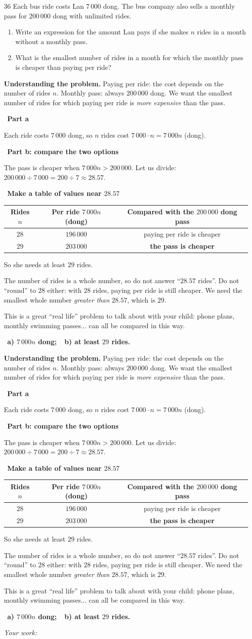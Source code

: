 \documentclass[11pt]{article}
\newif\ifsol \soltrue
\providecommand{\AnsWord}{Đáp số}
\newcommand{\ans}[1]{\par\smallskip{\bfseries\color{tmGreen!88!black}\AnsWord:}\ {\bfseries\color{AnsRed}#1}\par}
\newcommand{\probsol}[1]{%
  \begin{lrbox}{\solmeasure}\begin{minipage}{\dimexpr\linewidth-24pt\relax}#1\end{minipage}\end{lrbox}%
  \ifsol
    \begin{solbox}#1\end{solbox}%
  \else
    \setlength{\solht}{\dimexpr\ht\solmeasure+\dp\solmeasure+0.85cm\relax}%
    \ifdim\solht<1.35cm\setlength{\solht}{1.35cm}\fi
    \ifdim\solht>\StudentMaxWork\setlength{\solht}{\StudentMaxWork}\fi
    \begin{tcolorbox}[colback=white,colframe=Line,boxrule=0.8pt,arc=5pt,
      left=8pt,right=8pt,top=4pt,bottom=4pt,height=\solht]{\footnotesize\color{Slate}\itshape\WorkWord}\end{tcolorbox}%
  \fi}
\newlength{\StudentMaxWork}\setlength{\StudentMaxWork}{7.5cm}
\newcommand{\step}[2]{\par\smallskip\noindent{\bfseries\color{tmBlue!85!black}\StepWord~#1.}\ {\bfseries #2}\par\nopagebreak}
\def\WorkWord{Your work:}
\def\AnsWord{Answer}
\def\StepWord{Step}
\begin{document}
\begin{probbox}{36}{\relax}
Each bus ride costs Lan $7\,000$ dong. The bus company also sells a monthly pass for $200\,000$ dong with unlimited rides.
\begin{enumerate}[label=\alph*),leftmargin=1.6em,itemsep=1pt,topsep=2pt]
\item Write an expression for the amount Lan pays if she makes $n$ rides in a month without a monthly pass.
\item What is the smallest number of rides in a month for which the monthly pass is cheaper than paying per ride?
\end{enumerate}
\end{probbox}
\probsol{
\textbf{Understanding the problem.} Paying per ride: the cost depends on the number of rides $n$. Monthly pass: always $200\,000$ dong. We want the smallest number of rides for which paying per ride is \emph{more expensive} than the pass.
\step{1}{Part a}
Each ride costs $7\,000$ dong, so $n$ rides cost $7\,000\cdot n=7\,000n$ (dong).
\step{2}{Part b: compare the two options}
The pass is cheaper when $7\,000n>200\,000$. Let us divide: $200\,000\div 7\,000=200\div 7\approx 28.57$.
\step{3}{Make a table of values near $28.57$}
\begin{center}
\begin{tabular}{|c|c|c|}
\hline
\rowcolor{tmBlue!10} Rides $n$ & Per ride $7\,000n$ (dong) & Compared with the $200\,000$ dong pass\\ \hline
$28$ & $196\,000$ & paying per ride is cheaper\\ \hline
$29$ & $203\,000$ & \textbf{the pass is cheaper}\\ \hline
\end{tabular}
\end{center}
So she needs at least $29$ rides.
\begin{warnbox}The number of rides is a whole number, so do not answer ``$28.57$ rides''. Do not ``round'' to $28$ either: with $28$ rides, paying per ride is still cheaper. We need the smallest whole number \emph{greater than} $28.57$, which is $29$.\end{warnbox}
\begin{parentbox}This is a great ``real life'' problem to talk about with your child: phone plans, monthly swimming passes... can all be compared in this way.\end{parentbox}
\ans{a) $7\,000n$ dong;\ \ b) at least $29$ rides.}
}
\end{document}
